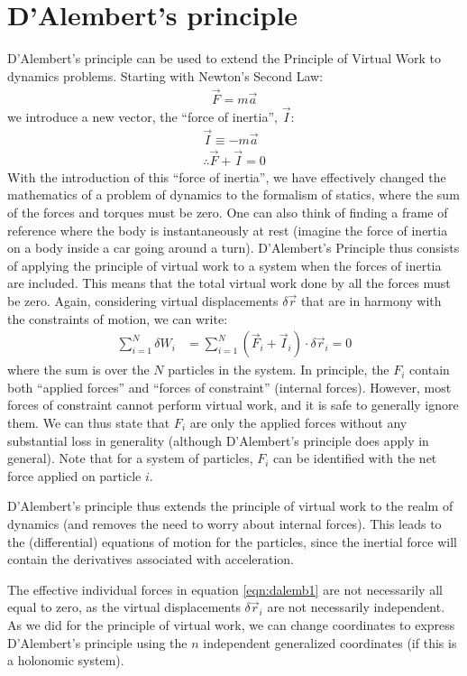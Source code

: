 \section{D'Alembert's principle}
D'Alembert's principle can be used to extend the Principle of Virtual Work to dynamics problems. Starting with Newton's Second Law:
\begin{align}
\vec{F}=m\vec{a}\nonumber
\end{align}
we introduce a new vector, the ``force of inertia'', $\vec{I}$:
\begin{align}
\vec{I}\equiv-m\vec{a}\nonumber\\
\therefore \vec{F}+\vec{I}=0
\end{align}
With the introduction of this ``force of inertia'', we have effectively changed the mathematics of a problem of dynamics to the formalism of statics, where the sum of the forces and torques must be zero. One can also think of finding a frame of reference where the body is instantaneously at rest (imagine the force of inertia on a body inside a car going around a turn). D'Alembert's Principle thus consists of applying the principle of virtual work to a system when the forces of inertia are included. This means that the total virtual work done by all the forces must be zero. Again, considering virtual displacements $\delta\vec{r}$ that are in harmony with the constraints of motion, we can write:
\begin{align}
\sum_{i=1}^N\delta W_i&= \sum_{i=1}^N (\vec{F}_i+\vec{I}_i)\cdot\delta\vec{r}_i=0
\label{eqn:dalemb1}
\end{align}
where the sum is over the $N$ particles in the system. In principle, the $F_i$ contain both ``applied forces'' and ``forces of constraint'' (internal forces). However, most forces of constraint cannot perform virtual work, and it is safe to generally ignore them. We can thus state that $F_i$ are only the applied forces without any substantial loss in generality (although D'Alembert's principle does apply in general). Note that for a system of particles, $F_i$ can be identified with the net force applied on particle $i$.

D'Alembert's principle thus extends the principle of virtual work to the realm of dynamics (and removes the need to worry about internal forces). This leads to the (differential) equations of motion  for the particles, since the inertial force will contain the derivatives associated with acceleration.

The effective individual forces in equation \ref{eqn:dalemb1} are not necessarily all equal to zero, as the virtual displacements $\delta\vec{r}_i$ are not necessarily independent. As we did for the principle of virtual work, we can change coordinates to express D'Alembert's principle using the $n$ independent generalized coordinates (if this is a holonomic system).

